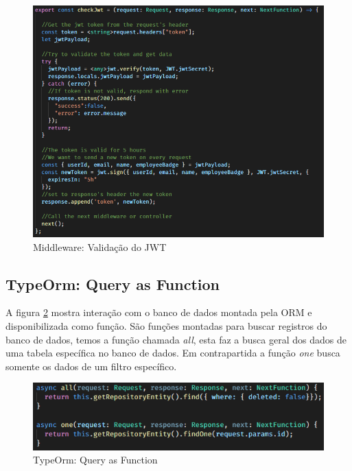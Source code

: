 \begin{figure}[htb]
	\caption{\label{code_server_middleware}Middleware: Validação do JWT}
	\begin{center}
		\includegraphics[scale=0.80]{./Figuras/code/server/middleware.png}
	\end{center}
\end{figure}



\newpage
\subsection{TypeOrm: Query as Function}

A figura \ref{code_server_typeorm-query-as-function} mostra interação com o banco de dados montada pela ORM e disponibilizada como função. São funções montadas para buscar registros do banco de dados, temos a função chamada \textit{all}, esta faz a busca geral dos dados de uma tabela específica no banco de dados. Em contrapartida a função \textit{one} busca somente os dados de um filtro específico.

\begin{figure}[htb]
	\caption{\label{code_server_typeorm-query-as-function}TypeOrm: Query as Function}
	\begin{center}
		\includegraphics[scale=1.00]{./Figuras/code/server/typeorm-query-as-function.png}
	\end{center}
\end{figure}



